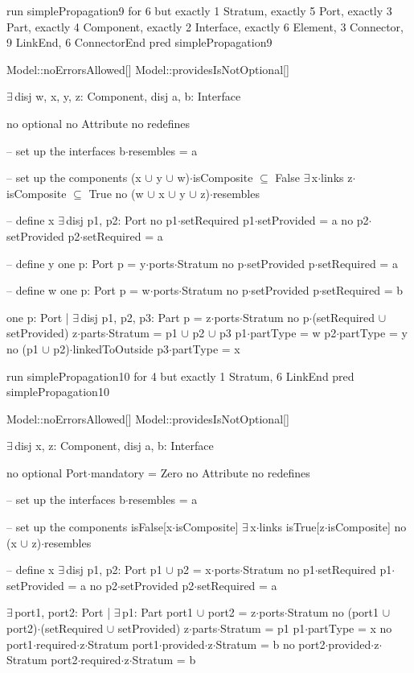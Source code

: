 run simplePropagation9 for 6 but exactly 1 Stratum, exactly 5 Port, exactly 3 Part, exactly 4 Component, exactly 2 Interface, exactly 6 Element, 3 Connector, 9 LinkEnd, 6 ConnectorEnd
pred simplePropagation9
{
  Model::noErrorsAllowed[]
  Model::providesIsNotOptional[]

  $\exists\,$disj w, x, y, z: Component,
       disj a, b: Interface
  {
    no optional
    no Attribute
    no redefines
  
    -- set up the interfaces
    b$\cdot$resembles = a
  
    -- set up the components
    (x $\cup$ y $\cup$ w)$\cdot$isComposite $\subseteq$ False
    $\exists\,$x$\cdot$links
    z$\cdot$isComposite $\subseteq$ True
    no (w $\cup$ x $\cup$ y $\cup$ z)$\cdot$resembles
    
    -- define x
    $\exists\,$disj p1, p2: Port
    {
      no p1$\cdot$setRequired
      p1$\cdot$setProvided = a
      no p2$\cdot$setProvided
      p2$\cdot$setRequired = a
    }
    
    -- define y
    one p: Port
    {
      p = y$\cdot$ports$\cdot$Stratum
      no p$\cdot$setProvided
      p$\cdot$setRequired = a
    }
    
    -- define w
    one p: Port
    {
      p = w$\cdot$ports$\cdot$Stratum
      no p$\cdot$setProvided
      p$\cdot$setRequired = b
    }
    
    one p: Port | $\exists\,$disj p1, p2, p3: Part
    {
      p = z$\cdot$ports$\cdot$Stratum
      no p$\cdot$(setRequired $\cup$ setProvided)
      z$\cdot$parts$\cdot$Stratum = p1 $\cup$ p2 $\cup$ p3
      p1$\cdot$partType = w
      p2$\cdot$partType = y
      no (p1 $\cup$ p2)$\cdot$linkedToOutside
      p3$\cdot$partType = x
    }
  }
}

run simplePropagation10 for 4 but exactly 1 Stratum, 6 LinkEnd
pred simplePropagation10
{
  Model::noErrorsAllowed[]
  Model::providesIsNotOptional[]

  $\exists\,$disj x, z: Component,
       disj a, b: Interface
  {
    no optional
    Port$\cdot$mandatory = Zero
    no Attribute
    no redefines
  
    -- set up the interfaces
    b$\cdot$resembles = a
  
    -- set up the components
    isFalse[x$\cdot$isComposite]
    $\exists\,$x$\cdot$links
    isTrue[z$\cdot$isComposite]
    no (x $\cup$ z)$\cdot$resembles
    
    -- define x
    $\exists\,$disj p1, p2: Port
    {
      p1 $\cup$ p2 = x$\cdot$ports$\cdot$Stratum
      no p1$\cdot$setRequired
      p1$\cdot$setProvided = a
      no p2$\cdot$setProvided
      p2$\cdot$setRequired = a
    }
    
    $\exists\,$port1, port2: Port | $\exists\,$p1: Part
    {
      port1 $\cup$ port2 = z$\cdot$ports$\cdot$Stratum
      no (port1 $\cup$ port2)$\cdot$(setRequired $\cup$ setProvided)
      z$\cdot$parts$\cdot$Stratum = p1
      p1$\cdot$partType = x
      no port1$\cdot$required$\cdot$z$\cdot$Stratum
      port1$\cdot$provided$\cdot$z$\cdot$Stratum = b
      no port2$\cdot$provided$\cdot$z$\cdot$Stratum
      port2$\cdot$required$\cdot$z$\cdot$Stratum = b
    }
  }
}

